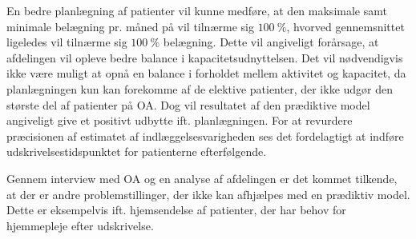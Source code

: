 En bedre planlægning af patienter vil kunne medføre, at den maksimale samt minimale belægning pr. måned på  vil tilnærme sig $100~\%$, hvorved gennemsnittet ligeledes vil tilnærme sig $100~\%$ belægning. Dette vil angiveligt forårsage, at afdelingen vil opleve bedre balance i kapacitetsudnyttelsen. Det vil nødvendigvis ikke være muligt at opnå en balance i forholdet mellem aktivitet og kapacitet, da planlægningen kun kan forekomme af de elektive patienter, der ikke udgør den største del af patienter på OA. 
Dog vil resultatet af den prædiktive model angiveligt give et positivt udbytte ift. planlægningen. For at revurdere præcisionen af estimatet af indlæggelsesvarigheden ses det fordelagtigt at indføre udskrivelsestidspunktet for patienterne efterfølgende.

Gennem interview med OA og en analyse af afdelingen er det kommet tilkende, at der er andre problemstillinger, der ikke kan afhjælpes med en prædiktiv model. Dette er eksempelvis ift. hjemsendelse af patienter, der har behov for hjemmepleje efter udskrivelse.
